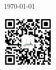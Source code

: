 \documentclass[UTF8]{ctexart}
\begin{document}
\begin{titlepage}
  {\large \today\par}
  \vspace*{\baselineskip}
\vfill
  \raggedleft
  \includegraphics[width=0.2\textwidth]{QR-code.png}

\end{titlepage}
 
\end{document}
